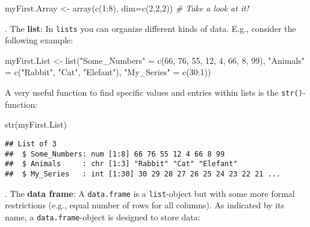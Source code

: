 \documentclass[
]{book}
\newenvironment{Shaded}{\begin{snugshade}}{\end{snugshade}}
\newcommand{\AttributeTok}[1]{\textcolor[rgb]{0.77,0.63,0.00}{#1}}
\newcommand{\CommentTok}[1]{\textcolor[rgb]{0.56,0.35,0.01}{\textit{#1}}}
\newcommand{\DecValTok}[1]{\textcolor[rgb]{0.00,0.00,0.81}{#1}}
\newcommand{\FunctionTok}[1]{\textcolor[rgb]{0.00,0.00,0.00}{#1}}
\newcommand{\NormalTok}[1]{#1}
\newcommand{\OtherTok}[1]{\textcolor[rgb]{0.56,0.35,0.01}{#1}}
\newcommand{\SpecialCharTok}[1]{\textcolor[rgb]{0.00,0.00,0.00}{#1}}
\newcommand{\StringTok}[1]{\textcolor[rgb]{0.31,0.60,0.02}{#1}}
\begin{document}
\begin{Shaded}
\begin{Highlighting}[]
\NormalTok{myFirst.Array }\OtherTok{\textless{}{-}} \FunctionTok{array}\NormalTok{(}\FunctionTok{c}\NormalTok{(}\DecValTok{1}\SpecialCharTok{:}\DecValTok{8}\NormalTok{), }\AttributeTok{dim=}\FunctionTok{c}\NormalTok{(}\DecValTok{2}\NormalTok{,}\DecValTok{2}\NormalTok{,}\DecValTok{2}\NormalTok{)) }\CommentTok{\# Take a look at it!}
\end{Highlighting}
\end{Shaded}

\hfill\break
\hfill{}. The \textbf{list}: In \texttt{lists} you can organize different kinds of data. E.g., consider the following example:

\begin{Shaded}
\begin{Highlighting}[]
\NormalTok{myFirst.List }\OtherTok{\textless{}{-}} \FunctionTok{list}\NormalTok{(}\StringTok{"Some\_Numbers"} \OtherTok{=} \FunctionTok{c}\NormalTok{(}\DecValTok{66}\NormalTok{, }\DecValTok{76}\NormalTok{, }\DecValTok{55}\NormalTok{, }\DecValTok{12}\NormalTok{, }\DecValTok{4}\NormalTok{, }\DecValTok{66}\NormalTok{, }\DecValTok{8}\NormalTok{, }\DecValTok{99}\NormalTok{), }
                     \StringTok{"Animals"}      \OtherTok{=} \FunctionTok{c}\NormalTok{(}\StringTok{"Rabbit"}\NormalTok{, }\StringTok{"Cat"}\NormalTok{, }\StringTok{"Elefant"}\NormalTok{),}
                     \StringTok{"My\_Series"}    \OtherTok{=} \FunctionTok{c}\NormalTok{(}\DecValTok{30}\SpecialCharTok{:}\DecValTok{1}\NormalTok{)) }
\end{Highlighting}
\end{Shaded}

A very useful function to find specific values and entries within lists is the \texttt{str()}-function:

\begin{Shaded}
\begin{Highlighting}[]
\FunctionTok{str}\NormalTok{(myFirst.List)}
\end{Highlighting}
\end{Shaded}

\begin{verbatim}
## List of 3
##  $ Some_Numbers: num [1:8] 66 76 55 12 4 66 8 99
##  $ Animals     : chr [1:3] "Rabbit" "Cat" "Elefant"
##  $ My_Series   : int [1:30] 30 29 28 27 26 25 24 23 22 21 ...
\end{verbatim}

\hfill\break
\hfill{}. The \textbf{data frame}: A \texttt{data.frame} is a \texttt{list}-object but with some more formal restrictions (e.g., equal number of rows for all columns). As indicated by its name, a \texttt{data.frame}-object is designed to store data:
\end{document}
